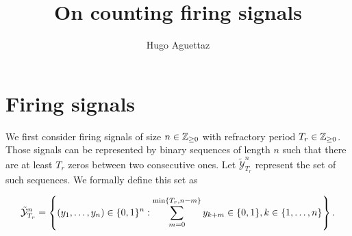 \documentclass{article}
\title{On counting firing signals}
\author{Hugo Aguettaz}
\begin{document}
    \maketitle


    
    
    \section{Firing signals} \label{sec:aperiodic}

    We first consider firing signals of size $n \in \mathbb{Z}_{\geq 0}$ with refractory period $T_r \in \mathbb{Z}_{\geq 0}$. Those signals can be represented by binary 
    sequences of length $n$ such that there are at least $T_r$ zeros between two consecutive ones. Let $\tilde{\mathcal{Y}}_{T_r}^n$
    represent the set of such sequences. We formally define this set as
    
    \begin{equation}
        \tilde{\mathcal{Y}}_{T_r}^n = \left\{ (y_1, \dots, y_n) \in \{0, 1\}^n :
       \sum_{m=0}^{\min\{T_r, n - m\}} y_{k+m} \in \{0, 1\}, k \in \{1, \dots, n\} \right\}.
    \end{equation}
    
\end{document}
